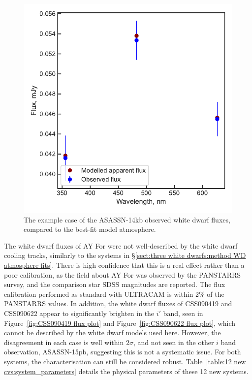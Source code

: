 \begin{figure}
    \centering
    \includegraphics[width=\textwidth]{figures/results/ASASSN-14kb/fluxplot.pdf}
    \caption{The example case of the ASASSN-14kb observed white dwarf fluxes, compared to the best-fit model atmosphere.}
    \label{fig:results:12 new CVs:ASASSN-14kb flux plot}
\end{figure}

The white dwarf fluxes of AY For were not well-described by the white dwarf cooling tracks, similarly to the systems in \S\ref{sect:three white dwarfs:method WD atmosphere fits}. There is high confidence that this is a real effect rather than a poor calibration, as the field about AY For was observed by the PANSTARRS survey, and the comparison star SDSS magnitudes are reported. The flux calibration performed as standard with ULTRACAM is within 2\% of the PANSTARRS values.
In addition, the white dwarf fluxes of CSS090419 and CSS090622 appear to significantly brighten in the $i'$ band, seen in Figure~\ref{fig:CSS090419 flux plot} and Figure~\ref{fig:CSS090622 flux plot}, which cannot be described by the white dwarf models used here. However, the disagreement in each case is well within $2 \sigma$, and not seen in the other $i$ band observation, ASASSN-15pb, suggesting this is not a systematic issue. For both systems, the characterisation can still be considered robust.
Table~\ref{table:12 new cvs:system_parameters} details the physical parameters of these 12 new systems.


